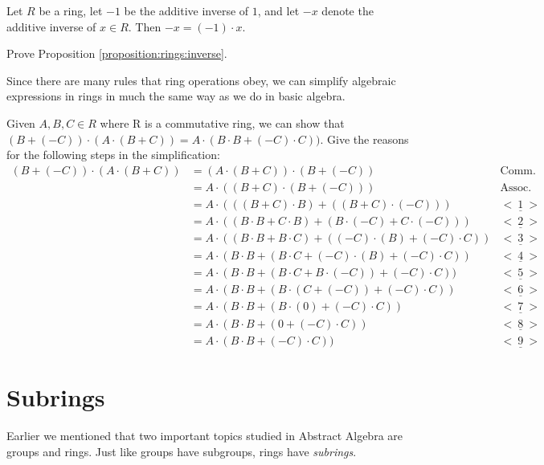 \begin{prop}\label{proposition:rings:inverse}
Let $R$ be a ring, let $-1$ be the additive inverse of $1$, and let $-x$ denote the additive inverse of $x\in R$. Then $-x=(-1)\cdot x$.
\end{prop}

\begin{exercise}
Prove Proposition \ref{proposition:rings:inverse}.
\end{exercise}

Since there are many rules that ring operations obey,
we can simplify algebraic expressions in rings in much the same way as we do in basic algebra.

\begin{exercise}\label{exercise:rings:comm_ring}
Given $A,B,C\in R$ where R is a commutative ring, we can show that $(B+(-C))\cdot(A\cdot(B+C))=A\cdot(B\cdot B+(-C)\cdot C))$. Give the reasons for the following steps in the simplification:
\begin{align*}
(B+(-C))\cdot(A\cdot(B+C))&=(A\cdot(B+C))\cdot(B+(-C)) & \text{Comm. prop.}\\   
&=A\cdot((B+C)\cdot(B+(-C))) & \text{Assoc. prop.}\\
&=A\cdot(((B+C)\cdot B)+((B+C)\cdot(-C))) & \underline{<~1~>}\\
&=A\cdot((B\cdot B+C\cdot B)+(B\cdot (-C)+C\cdot (-C))) & \underline{<~2~>}\\
&=A\cdot((B\cdot B+B\cdot C)+((-C)\cdot(B)+(-C)\cdot C))  & \underline{<~3~>}\\
&=A\cdot(B\cdot B+(B\cdot C+(-C)\cdot(B)+(-C)\cdot C))  & \underline{<~4~>}\\
&=A\cdot(B\cdot B+(B\cdot C+B\cdot(-C))+(-C)\cdot C)) & \underline{<~5~>}\\
&=A\cdot(B\cdot B+(B\cdot(C+(-C))+(-C)\cdot C)) & \underline{<~6~>}\\
&=A\cdot(B\cdot B+(B\cdot(0)+(-C)\cdot C)) & \underline{<~7~>}\\
&=A\cdot(B\cdot B+(0+(-C)\cdot C)) & \underline{<~8~>}\\
&=A\cdot(B\cdot B+(-C)\cdot C)) & \underline{<~9~>}
\end{align*}
\end{exercise}

\section{Subrings}
\label{sec:Subrings}

Earlier we mentioned that two important topics studied in Abstract Algebra are groups and rings. Just like groups have subgroups, rings have \emph{subrings}.

